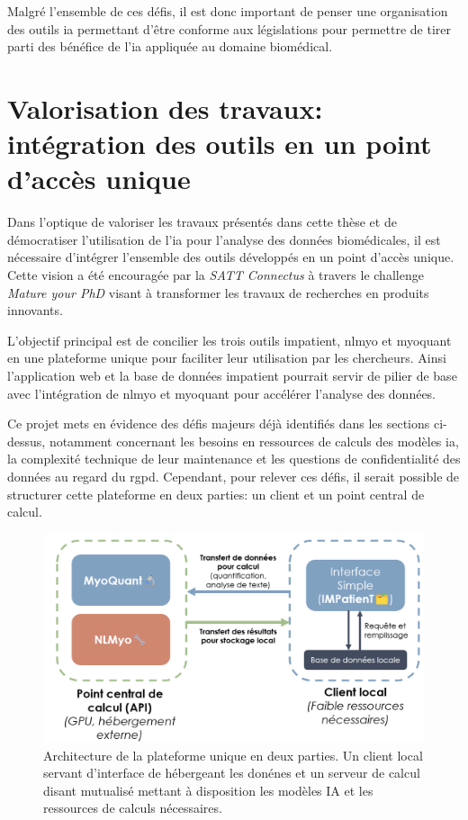Malgré l'ensemble de ces défis, il est donc important de penser une organisation des outils \gls{ia} permettant d'être conforme aux législations pour permettre de tirer parti des bénéfice de l'\gls{ia} appliquée au domaine biomédical.

\section{Valorisation des travaux: intégration des outils en un point d'accès unique}
Dans l'optique de valoriser les travaux présentés dans cette thèse et de démocratiser l'utilisation de l'\gls{ia} pour l'analyse des données biomédicales, il est nécessaire d'intégrer l'ensemble des outils développés en un point d'accès unique. Cette vision a été encouragée par la \textit{SATT Connectus} à travers le challenge \textit{Mature your PhD} visant à transformer les travaux de recherches en produits innovants.

L'objectif principal est de concilier les trois outils \gls{impatient}, \gls{nlmyo} et \gls{myoquant} en une plateforme unique pour faciliter leur utilisation par les chercheurs. Ainsi l'application web et la base de données \gls{impatient} pourrait servir de pilier de base avec l'intégration de \gls{nlmyo} et \gls{myoquant} pour accélérer l'analyse des données.

Ce projet mets en évidence des défis majeurs déjà identifiés dans les sections ci-dessus, notamment concernant les besoins en ressources de calculs des modèles \gls{ia}, la complexité technique de leur maintenance et les questions de confidentialité des données au regard du \gls{rgpd}. Cependant, pour relever ces défis, il serait possible de structurer cette plateforme en deux parties: un client et un point central de calcul.
 \begin{figure}[htbp]
 \centering
 \includegraphics[width=1\textwidth]{figures/perspective_unique.png}
 \caption[Architecture de la plateforme unique en deux parties]{Architecture de la plateforme unique en deux parties. Un client local servant d'interface de hébergeant les donénes et un serveur de calcul disant mutualisé mettant à disposition les modèles IA et les ressources de calculs nécessaires.}
 \label{fig:perspective_unique}
\end{figure}

